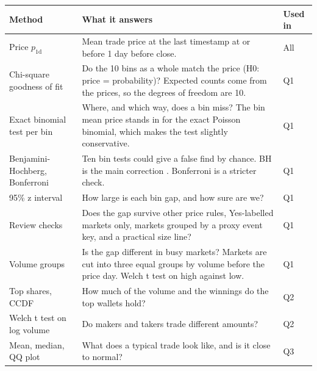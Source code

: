 \documentclass[10pt]{article}
\newcommand{\hd}[1]{\medskip\noindent{\large\bfseries #1}\par\nopagebreak}
\newcommand{\NBins}{10}
\newcommand{\CiLevel}{95\%}
\newcommand{\DaysShort}{1}
\newcommand{\pOne}{\ensuremath{p_{1\mathrm{d}}}}
\begin{document}
\clearpage
\hd{Appendix B. Methods}
\noindent\begin{tabularx}{\textwidth}{@{}lXl@{}}
\toprule
Method & What it answers & Used in \\
\midrule
Price \pOne & Mean trade price at the last timestamp at or before \DaysShort{} day before close. & All \\
\midrule
Chi-square goodness of fit & Do the 10 bins as a whole match the price (H0: price = probability)? Expected counts come from the prices, so the degrees of freedom are \NBins. & Q1 \\
\midrule
Exact binomial test per bin & Where, and which way, does a bin miss? The bin mean price stands in for the exact Poisson binomial, which makes the test slightly conservative. & Q1 \\
\midrule
Benjamini-Hochberg, Bonferroni & Ten bin tests could give a false find by chance. BH is the main correction \citep{benjamini1995controlling}. Bonferroni is a stricter check. & Q1 \\
\midrule
\CiLevel{} z interval & How large is each bin gap, and how sure are we? & Q1 \\
\midrule
Review checks & Does the gap survive other price rules, Yes-labelled markets only, markets grouped by a proxy event key, and a practical size line? & Q1 \\
\midrule
Volume groups & Is the gap different in busy markets? Markets are cut into three equal groups by volume before the price day. Welch t test on high against low. & Q1 \\
\midrule
Top shares, CCDF & How much of the volume and the winnings do the top wallets hold? & Q2 \\
\midrule
Welch t test on log volume & Do makers and takers trade different amounts? & Q2 \\
\midrule
Mean, median, QQ plot & What does a typical trade look like, and is it close to normal? & Q3 \\
\bottomrule
\end{tabularx}
\end{document}
